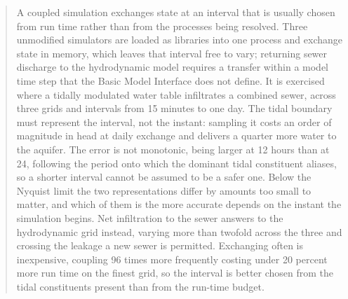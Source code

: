 \documentclass[preprint,authoryear,11pt]{elsarticle}
\begin{document}
\begin{frontmatter}
%
%
%
\begin{abstract}
A coupled simulation exchanges state at an interval that is usually chosen from run time rather than from the processes being resolved. Three unmodified simulators are loaded as libraries into one process and exchange state in memory, which leaves that interval free to vary; returning sewer discharge to the hydrodynamic model requires a transfer within a model time step that the Basic Model Interface does not define. It is exercised where a tidally modulated water table infiltrates a combined sewer, across three grids and intervals from 15 minutes to one day. The tidal boundary must represent the interval, not the instant: sampling it costs an order of magnitude in head at daily exchange and delivers a quarter more water to the aquifer. The error is not monotonic, being larger at 12 hours than at 24, following the period onto which the dominant tidal constituent aliases, so a shorter interval cannot be assumed to be a safer one. Below the Nyquist limit the two representations differ by amounts too small to matter, and which of them is the more accurate depends on the instant the simulation begins. Net infiltration to the sewer answers to the hydrodynamic grid instead, varying more than twofold across the three and crossing the leakage a new sewer is permitted. Exchanging often is inexpensive, coupling 96 times more frequently costing under 20 percent more run time on the finest grid, so the interval is better chosen from the tidal constituents present than from the run-time budget.
\end{abstract}


\end{frontmatter}
\end{document}
